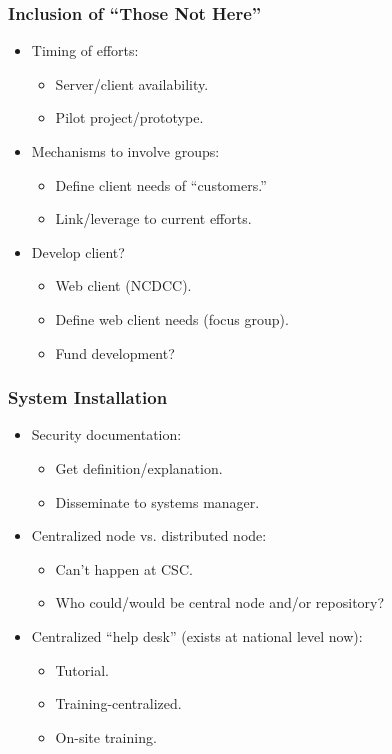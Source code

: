 \subsubsection{Inclusion of ``Those Not Here''}
\begin{itemize}
\item Timing of efforts:
\begin{itemize}
  \item Server/client availability.
  \item Pilot project/prototype.
\end{itemize}
\item Mechanisms to involve groups:
\begin{itemize}
  \item Define client needs of ``customers.''
  \item Link/leverage to current efforts.
\end{itemize}
\item Develop client?
\begin{itemize}
  \item Web client (NCDCC).
  \item Define web client needs (focus group).
  \item Fund development?
\end{itemize}
\end{itemize}

\subsubsection{System Installation}
\begin{itemize}
\item Security documentation:
\begin{itemize}
  \item Get definition/explanation.
  \item Disseminate to systems manager.
\end{itemize}
\item Centralized node vs. distributed node:
\begin{itemize}
  \item Can't happen at CSC.
  \item Who could/would be central node and/or repository?
\end{itemize}
\item Centralized ``help desk'' (exists at national level now):
\begin{itemize}
  \item Tutorial.
  \item Training-centralized.
  \item On-site training.
\end{itemize}
\end{itemize}

